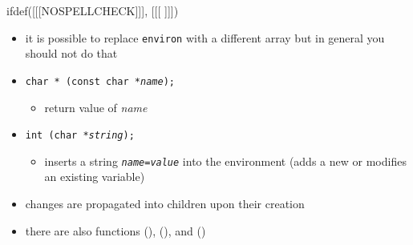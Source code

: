 
ifdef([[[NOSPELLCHECK]]], [[[
]]])

\begin{slide}
\begin{itemize}
\item it is possible to replace \texttt{environ} with a different array but in
general you should not do that
\item \texttt{char * (const char *\emph{name});}
    \begin{itemize}
    \item return value of \emph{name}
    \end{itemize}
\item \texttt{int  (char *\emph{string});} 
    \begin{itemize}
    \item inserts a string \texttt{\emph{name}=\emph{value}} into the
    environment (adds a new or modifies an existing variable)
    \end{itemize}
\item changes are propagated into children upon their creation
\item there are also functions (), (), and
()
\end{itemize}
\end{slide}

